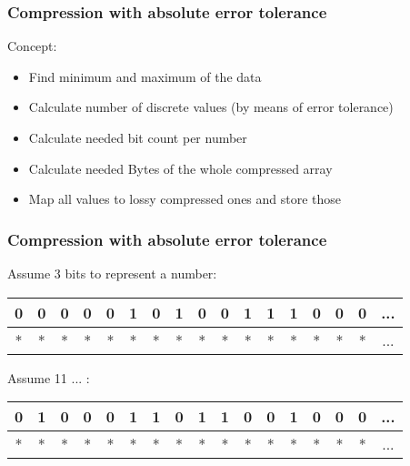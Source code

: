 \documentclass[compress]{beamer}
\begin{document}
\begin{frame}
	\frametitle{Compression with absolute error tolerance}

	Concept:

	\begin{itemize}[<+->]
		\pause
		\item Find minimum and maximum of the data
		\item Calculate number of discrete values (by means of error tolerance)
		\item Calculate needed bit count per number
		\item Calculate needed Bytes of the whole compressed array
		\item Map all values to lossy compressed ones and store those

	\end{itemize}
\end{frame}

\begin{frame}
	\frametitle{Compression with absolute error tolerance}

	Assume 3 bits to represent a number:
	\bigskip\mbox{}
	\pause

	\begin{tabular}{|ccccccccccccccccc}
		\hline
		0 & 0 & \multicolumn{1}{c|}{0} & 0 & 0 & \multicolumn{1}{c|}{1} & 0 & 1 & \multicolumn{1}{c|}{0} & 0 & 1 & \multicolumn{1}{c|}{1} & 1 & 0 & \multicolumn{1}{c|}{0} & 0 & ... \\ \hline
		\hline
		* & * & * & * & * & * & * & \multicolumn{1}{c|}{*} & * & * & * & * & * & * & * & \multicolumn{1}{c|}{*} & ... \\ \hline
	\end{tabular}
	\bigskip\bigskip\mbox{}
	\pause 

	Assume 11 ... :
	\bigskip\mbox{}
	\pause

	\begin{tabular}{|ccccccccccccccccc}
		\hline
		0 & 1 & 0 & 0 & 0 & 1 & 1 & 0 & 1 & 1 & \multicolumn{1}{c|}{0} & 0 & 1 & 0 & 0 & 0 & ... \\ \hline
		\hline
		* & * & * & * & * & * & * & \multicolumn{1}{c|}{*} & * & * & * & * & * & * & * & \multicolumn{1}{c|}{*} & ... \\ \hline
	\end{tabular}

\end{frame}
\end{document}
